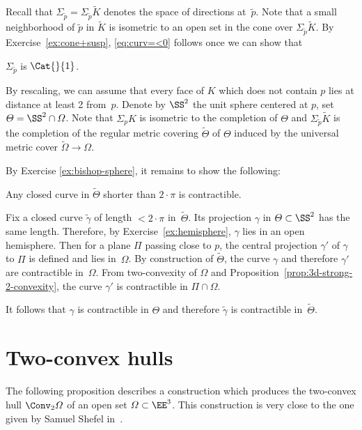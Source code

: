 Recall that $\Sigma_{\tilde p}=\Sigma_{\tilde p}\tilde K$ denotes the space of directions at~$\tilde p$.
Note that a small neighborhood of $\tilde p$ in $\tilde K$
is isometric to an open set in the cone over $\Sigma_{\tilde p}\tilde K$.
By Exercise~\ref{ex:cone+susp}, \ref{eq:curv=<0} follows once we can show that

\begin{clm}{}\label{eq:curv=<1}
$\Sigma_{\tilde p}$ is $\Cat{}{1}$.
\end{clm}

By  rescaling, we can assume that every face of $K$ which does not contain $p$ lies at distance at least 2 from~$p$.
Denote by $\SS^2$ the unit sphere centered at $p$,
set $\Theta=\SS^2\cap\Omega$.
Note that $\Sigma_pK$ is isometric to the completion of $\Theta$
and $\Sigma_{\tilde p}\tilde K$ is the completion of the regular metric covering $\tilde\Theta$ of $\Theta$  induced by the universal metric cover $\tilde \Omega\to \Omega$.

By Exercise \ref{ex:bishop-sphere}, it remains to show  the following:
\begin{clm}{}
Any closed curve in $\tilde\Theta$ shorter than $2\cdot\pi$ is contractible.
\end{clm}

Fix a closed curve $\tilde \gamma$ of length $<2\cdot\pi$ in~$\tilde\Theta$.
Its projection $\gamma$ in $\Theta\subset\SS^2$ has the same length.
Therefore, by Exercise~\ref{ex:hemisphere}, $\gamma$ lies in an open hemisphere.
Then for a plane $\Pi$ passing close to $p$,
the central projection $\gamma'$ of $\gamma$ to $\Pi$ is defined and lies in~$\Omega$.
By construction of $\tilde\Theta$, the curve $\gamma$ and therefore $\gamma'$ are contractible in~$\Omega$.
From two-convexity of $\Omega$
and Proposition~\ref{prop:3d-strong-2-convexity},
the curve $\gamma'$ is contractible in $\Pi\cap \Omega$.


It follows that $\gamma$ is contractible in $\Theta$ 
and therefore $\tilde\gamma$ is contractible in~$\tilde\Theta$.
\qeds

\section{Two-convex hulls}

The following proposition 
describes a construction which produces the two-convex hull $\Conv_2 \Omega$ of an open set $\Omega\subset\EE^3$.
This construction is very close to the one given by Samuel Shefel in~\cite{shefel-3D}.


